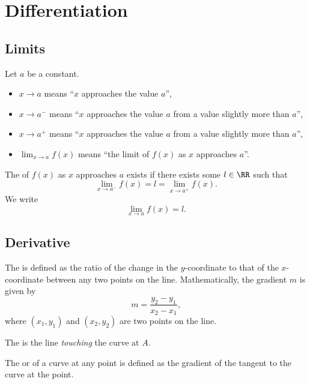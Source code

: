 \chapter{Differentiation}

\section{Limits}

Let $a$ be a constant. 
\begin{itemize}
    \item $x \to a$ means ``$x$ approaches the value $a$'',
    \item $x \to a^-$ means ``$x$ approaches the value $a$ from a value slightly more than $a$'',
    \item $x \to a^+$ means ``$x$ approaches the value $a$ from a value slightly more than $a$'',
    \item $\lim_{x \to a} f(x)$ means ``the limit of $f(x)$ as $x$ approaches $a$''.
\end{itemize}

\begin{definition}
    The  of $f(x)$ as $x$ approaches $a$ exists if there exists some $l \in \RR$ such that \[\lim_{x \to a^-} f(x) = l = \lim_{x \to a^+} f(x).\] We write \[\lim_{x \to a} f(x) = l.\]
\end{definition}

\section{Derivative}

\begin{definition}
    The  is defined as the ratio of the change in the $y$-coordinate to that of the $x$-coordinate between any two points on the line. Mathematically, the gradient $m$ is given by \[m = \frac{y_2 - y_1}{x_2 - x_1},\] where $(x_1, y_1)$ and $(x_2, y_2)$ are two points on the line.
\end{definition}

\begin{definition}
    The  is the line \textit{touching} the curve at $A$.
\end{definition}

\begin{definition}
    The  or  of a curve at any point is defined as the gradient of the tangent to the curve at the point.
\end{definition}

